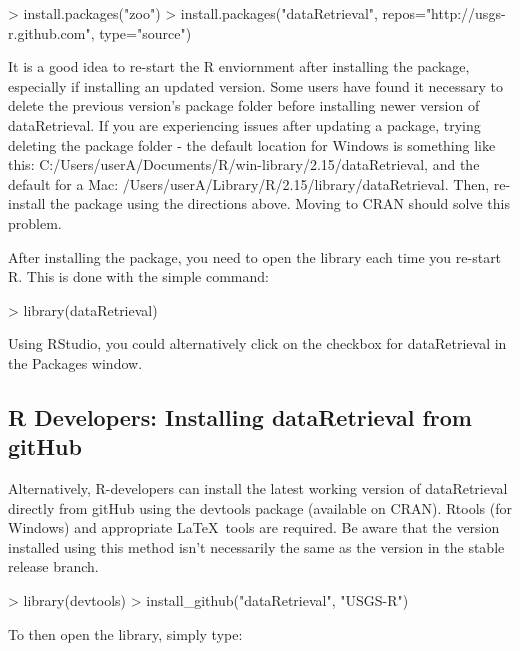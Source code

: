 \documentclass[a4paper,11pt]{article}
\begin{document}
\begin{Schunk}
\begin{Sinput}
> install.packages("zoo")
> install.packages("dataRetrieval", repos="http://usgs-r.github.com", type="source")
\end{Sinput}
\end{Schunk}

It is a good idea to re-start the R enviornment after installing the package, especially if installing an updated version. Some users have found it necessary to delete the previous version's package folder before installing newer version of dataRetrieval. If you are experiencing issues after updating a package, trying deleting the package folder - the default location for Windows is something like this: C:/Users/userA/Documents/R/win-library/2.15/dataRetrieval, and the default for a Mac: /Users/userA/Library/R/2.15/library/dataRetrieval. Then, re-install the package using the directions above. Moving to CRAN should solve this problem.

After installing the package, you need to open the library each time you re-start R.  This is done with the simple command:
\begin{Schunk}
\begin{Sinput}
> library(dataRetrieval)
\end{Sinput}
\end{Schunk}
Using RStudio, you could alternatively click on the checkbox for dataRetrieval in the Packages window.

\subsection{R Developers: Installing dataRetrieval from gitHub}
Alternatively, R-developers can install the latest working version of dataRetrieval directly from gitHub using the devtools package (available on CRAN).  Rtools (for Windows) and appropriate \LaTeX\ tools are required. Be aware that the version installed using this method isn't necessarily the same as the version in the stable release branch.  


\begin{Schunk}
\begin{Sinput}
> library(devtools)
> install_github("dataRetrieval", "USGS-R")
\end{Sinput}
\end{Schunk}
To then open the library, simply type:
\end{document}
